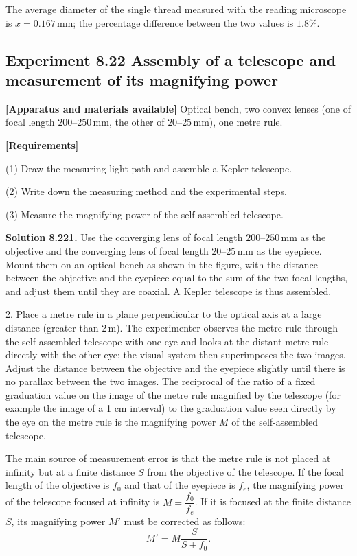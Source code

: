 The average diameter of the single thread measured with the reading microscope is $\bar{x}=0.167\,\mathrm{mm}$; the percentage difference between the two values is $1.8\%$.

\subsection*{Experiment 8.22 \quad Assembly of a telescope and measurement of its magnifying power}

\textbf{[Apparatus and materials available]} Optical bench, two convex lenses (one of focal length $200$--$250\,\mathrm{mm}$, the other of $20$--$25\,\mathrm{mm}$), one metre rule.

\textbf{[Requirements]}

(1) Draw the measuring light path and assemble a Kepler telescope.

(2) Write down the measuring method and the experimental steps.

(3) Measure the magnifying power of the self-assembled telescope.

\textbf{Solution 8.22}\quad \textbf{1.} Use the converging lens of focal length $200$--$250\,\mathrm{mm}$ as the objective and the converging lens of focal length $20$--$25\,\mathrm{mm}$ as the eyepiece. Mount them on an optical bench as shown in the figure, with the distance between the objective and the eyepiece equal to the sum of the two focal lengths, and adjust them until they are coaxial. A Kepler telescope is thus assembled.

2. Place a metre rule in a plane perpendicular to the optical axis at a large distance (greater than $2\,\mathrm{m}$). The experimenter observes the metre rule through the self-assembled telescope with one eye and looks at the distant metre rule directly with the other eye; the visual system then superimposes the two images. Adjust the distance between the objective and the eyepiece slightly until there is no parallax between the two images. The reciprocal of the ratio of a fixed graduation value on the image of the metre rule magnified by the telescope (for example the image of a 1 cm interval) to the graduation value seen directly by the eye on the metre rule is the magnifying power $M$ of the self-assembled telescope.

The main source of measurement error is that the metre rule is not placed at infinity but at a finite distance $S$ from the objective of the telescope. If the focal length of the objective is $f_0$ and that of the eyepiece is $f_e$, the magnifying power of the telescope focused at infinity is $M=\dfrac{f_0}{f_e}$. If it is focused at the finite distance $S$, its magnifying power $M'$ must be corrected as follows:
\[
M'=M\frac{S}{S+f_0}.
\]

